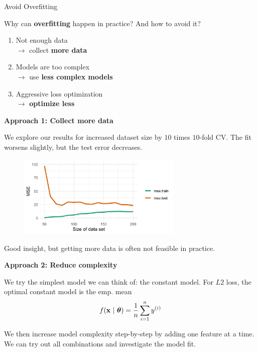 \documentclass[11pt,compress,t,notes=noshow, xcolor=table]{beamer}
\begin{document}
\begin{vbframe}{Avoid Overfitting} 

Why can \textbf{overfitting} happen in practice? And how to avoid it?
\lz
\lz
\begin{enumerate}
\item Not enough data \\
$\to$ collect \textbf{more data} 
\item Models are too complex \\
$\to$ use \textbf{less complex models}
\item Aggressive loss optimization \\
$\to$ \textbf{optimize less}
\end{enumerate}


\framebreak 

\textbf{Approach 1: Collect more data}

\lz 

We explore our results for increased dataset size by $10$ times $10$-fold CV.
The fit worsens slightly, but the test error decreases.

\begin{figure}
\includegraphics[width=0.7\textwidth]{figure/avoid_overfitting_01.png}\\
\end{figure}

Good insight, but getting more data is often not feasible in practice.

\framebreak

\textbf{Approach 2: Reduce complexity}


We try the simplest model we can think of: the constant model. For $L2$ loss, the optimal constant model is the emp. mean {\small $$f(\mathbf{x} ~|~ \bm{\theta}) = \frac{1}{n}\sum_{i=1}^n y^{(i)}$$}

We then increase model complexity step-by-step by adding one feature at a time. We can try out all combinations and investigate the model fit.



\end{vbframe}
\end{document}
